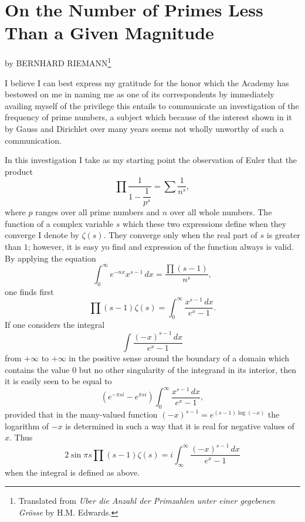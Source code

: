 \appendix

\chapter{On the Number of Primes Less Than a Given Magnitude}


\begin{flushleft}
\rightskip=0.5cm
by BERNHARD RIEMANN\footnote{Translated from \textit{Uber die Anzahl der Primzahlen unter einer gegebenen Grösse} by H.M. Edwards.}
\end{flushleft}

I believe I can best express my gratitude for the honor which the Academy 
has bestowed on me in naming me as one of its correspondents by immediately 
availing myself of the privilege this entails to communicate an investigation
of the frequency of prime numbers, a subject which because of the interest
shown in it by Gauss and Dirichlet over many years seems not wholly unworthy
of such a communication.

In this investigation I take as my starting point the observation of Euler
that the product
%
\[
\prod \frac{1}{1 - \dfrac{1}{p^s}} = \sum \frac{1}{n^s},
\]
%
where $p$ ranges over all prime numbers and $n$ over all whole numbers. The
function of a complex variable $s$ which these two expressions define when they
converge I denote by $\zeta(s)$. They converge only when the real part of $s$
is greater than $1$; however, it is easy yo find and expression of the function
always is valid. By applying the equation
%
\[
\int_0^{\infty} e^{-nx}x^{s-1} \, dx = \frac{\prod(s-1)}{n^s},
\]
%
one finds first
%
\[
\prod(s-1)\zeta(s) = \int_0^{\infty} \frac{x^{s-1}\, dx}{e^x - 1}.
\]
%
If one considers the integral
%
\[
\int \frac{(-x)^{s-1} \, dx}{e^x - 1}
\]
%
from $+\infty$ to $+\infty$ in the positive sense around the boundary
of a domain which contains the value 0 but no other singularity of the
integrand in its interior, then it is easily seen to be equal to
%
\[
(e^{-\pi si} - e^{\pi si})\int_0^{\infty} \frac{x^{s-1} \, dx}{e^x - 1},
\]
%
provided that in the many-valued function $(-x)^{s-1} = e^{(s-1)\log(-x)}$
the logarithm of $-x$ is determined in such a way that it is real for negative
values of $x$. Thus
%
\[
2\sin\pi s\prod(s-1)\zeta(s) 
= i \int_{\infty}^{\infty} \frac{(-x)^{s-1} \, dx}{e^x - 1}
\]
%
when the integral is defined as above.


